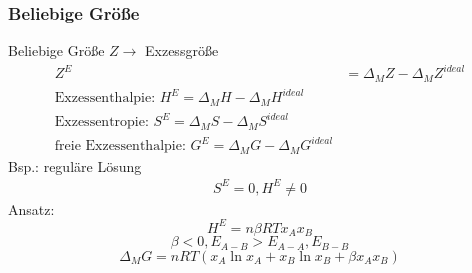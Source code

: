 \documentclass[a4paper, fleqn]{article}
\begin{document}
\subsubsection{Beliebige Größe}
Beliebige Größe $Z \rightarrow$ Exzessgröße\\
\begin{align*}
    Z^E &= \Delta_M Z - \Delta_M Z^{ideal}\\
    \text{Exzessenthalpie: } H^E = \Delta_M H - \Delta_M H^{ideal}\\
    \text{Exzessentropie: } S^E = \Delta_M S - \Delta_M S^{ideal}\\
    \text{freie Exzessenthalpie: } G^E = \Delta_M G - \Delta_M G^{ideal}
\end{align*}
Bsp.: reguläre Lösung
\begin{align*}
    S^E = 0, H^E \neq 0
\end{align*}
Ansatz:
\begin{equation*}
    H^E = n\beta RTx_Ax_B
\end{equation*}
\begin{equation*}   
    \beta < 0, E_{A-B}>E_{A-A},E_{B-B}
\end{equation*}
\begin{equation*}
    \Delta_M G = nRT(x_A\ln x_A + x_B \ln x_B + \beta x_Ax_B)
\end{equation*}
\end{document}
